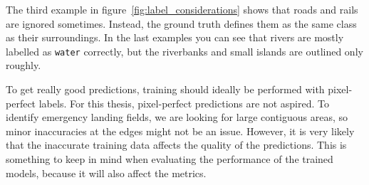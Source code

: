 The third example in figure~\ref{fig:label_considerations} shows that roads and rails are ignored sometimes. Instead, the ground truth defines them as the same class as their surroundings. In the last examples you can see that rivers are mostly labelled as \texttt{water} correctly, but the riverbanks and small islands are outlined only roughly.

To get really good predictions, training should ideally be performed with pixel-perfect labels. For this thesis, pixel-perfect predictions are not aspired. To identify emergency landing fields, we are looking for large contiguous areas, so minor inaccuracies at the edges might not be an issue. However, it is very likely that the inaccurate training data affects the quality of the predictions. This is something to keep in mind when evaluating the performance of the trained models, because it will also affect the metrics.

\clearpage

